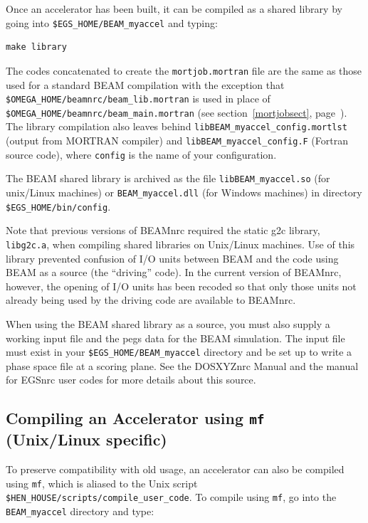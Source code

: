 \documentclass[12pt,twoside]{article}
\begin{document}
Once an accelerator has been built,
it can be compiled
as a shared library by going into {\tt \$EGS\_HOME/BEAM\_myaccel} and
typing:
\begin{verbatim}
make library
\end{verbatim}
The codes concatenated to create the {\tt mortjob.mortran} file are the same
as those used for a standard BEAM compilation with the exception that
\\{\tt \$OMEGA\_HOME/beamnrc/beam\_lib.mortran} is used in place of\\
{\tt \$OMEGA\_HOME/beamnrc/beam\_main.mortran} (see
section~\ref{mortjobsect}, page~\pageref{mortjobsect}).
The library compilation also leaves behind
{\tt libBEAM\_myaccel\_config.mortlst} (output from MORTRAN compiler) and
{\tt libBEAM\_myaccel\_config.F} (Fortran source code), where {\tt config}
is the name of your configuration.

The BEAM shared library is archived as the file {\tt libBEAM\_myaccel.so} (for
unix/Linux machines) or {\tt BEAM\_myaccel.dll} (for Windows machines) in
directory {\tt \$EGS\_HOME/bin/config}.

Note that previous versions of BEAMnrc required
the static g2c library, {\tt libg2c.a}, when compiling shared
libraries on Unix/Linux machines.  Use of this library prevented
confusion of I/O units between BEAM and the code using BEAM as a source
(the ``driving'' code).
In the current version of BEAMnrc, however, the opening of I/O units
has been recoded so that only those units not already being used by
the driving code are available to BEAMnrc.

When using the BEAM shared library as a source, you must also supply
a working input file and the pegs data for the BEAM simulation.  The input
file must exist in your {\tt \$EGS\_HOME/BEAM\_myaccel} directory and
be set up to write a phase space file at a scoring plane.  See the
DOSXYZnrc Manual\cite{Wa05} and the manual for EGSnrc user codes\cite{Ro03}
for more details about this source.

\subsection{Compiling an Accelerator using {\tt mf} (Unix/Linux specific)}
To preserve compatibility with old usage, an accelerator can also be
compiled using {\tt mf}, which is aliased to the Unix script
{\tt \$HEN\_HOUSE/scripts/compile\_user\_code}.  To compile using
{\tt mf}, go into the {\tt BEAM\_myaccel} directory and type:
\end{document}
